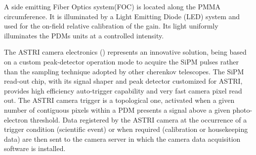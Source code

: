 A side emitting Fiber Optics system(FOC) is located  along the PMMA 
circumference. It is illuminated by a Light Emitting Diode (LED) 
system and used for the on-field relative calibration of the gain. 
Its light uniformly illuminates the PDMs units at a controlled intensity.


The ASTRI camera electronics (\cite{Sottile2016}) represents an innovative solution, being based on a custom peak-detector operation mode to acquire the SiPM pulses rather than the sampling technique adopted by other cherenkov telescopes. The SiPM  read-out chip, with its signal shaper and peak detector customized for ASTRI, provides high efficiency auto-trigger capability and very fast camera pixel read out. The ASTRI camera trigger is a topological one, activated when a given number of contiguous pixels within a PDM presents a signal above a given photo-electron threshold. Data registered by the ASTRI camera at the occurrence of a trigger condition (scientific event) or when required (calibration or housekeeping data) are then sent to the camera server in which the camera data acquisition software is installed. 
